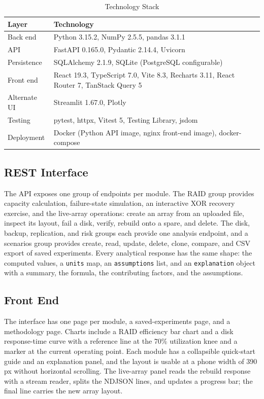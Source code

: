 \documentclass{ieeeaccess}
\begin{document}
\begin{table}[!t]
\caption{Technology Stack}
\label{tab:stack}
\centering
\footnotesize
\setlength{\tabcolsep}{4pt}
\begin{tabular}{p{2.0cm}p{5.8cm}}
\toprule
Layer & Technology \\
\midrule
Back end & Python 3.15.2, NumPy 2.5.5, pandas 3.1.1 \\
API & FastAPI 0.165.0, Pydantic 2.14.4, Uvicorn \\
Persistence & SQLAlchemy 2.1.9, SQLite (PostgreSQL configurable) \\
Front end & React 19.3, TypeScript 7.0, Vite 8.3, Recharts 3.11, React Router 7, TanStack Query 5 \\
Alternate UI & Streamlit 1.67.0, Plotly \\
Testing & pytest, httpx, Vitest 5, Testing Library, jsdom \\
Deployment & Docker (Python API image, nginx front-end image), docker-compose \\
\bottomrule
\end{tabular}
\end{table}

\subsection{REST Interface}
The API exposes one group of endpoints per module. The RAID group provides capacity calculation, failure-state simulation, an interactive XOR recovery exercise, and the live-array operations: create an array from an uploaded file, inspect its layout, fail a disk, verify, rebuild onto a spare, and delete. The disk, backup, replication, and risk groups each provide one analysis endpoint, and a scenarios group provides create, read, update, delete, clone, compare, and CSV export of saved experiments. Every analytical response has the same shape: the computed values, a \texttt{units} map, an \texttt{assumptions} list, and an \texttt{explanation} object with a summary, the formula, the contributing factors, and the assumptions.

\subsection{Front End}
The interface has one page per module, a saved-experiments page, and a methodology page. Charts include a RAID efficiency bar chart and a disk response-time curve with a reference line at the 70\% utilization knee and a marker at the current operating point. Each module has a collapsible quick-start guide and an explanation panel, and the layout is usable at a phone width of 390 px without horizontal scrolling. The live-array panel reads the rebuild response with a stream reader, splits the NDJSON lines, and updates a progress bar; the final line carries the new array layout.
\end{document}
